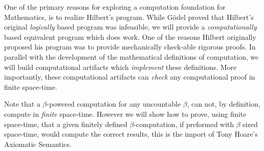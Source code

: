 One of the primary reasons for exploring a computation foundation for
Mathematics, is to realize Hilbert's program. While G\"odel proved that
Hilbert's original \emph{logically} based program was infeasible, we will
provide a \emph{computationally} based equivalent program which does work. One
of the reasons Hilbert originally proposed his program was to provide
mechanically check-able rigorous proofs. In parallel with the development of the
mathematical definitions of computation, we will build computational artifacts
which \emph{implement} these definitions. More importantly, these computational
artifacts can \emph{check} any computational proof in finite space-time.

Note that a $\beta$-powered computation for any uncountable $\beta$, can not, by
definition, compute in \emph{finite} space-time. However we will show how to
prove, using finite space-time, that a given finitely defined
$\beta$-computation, if preformed with $\beta$ sized space-time, would compute
the correct results, this is the import of Tony Hoare's Axiomatic Semantics.


